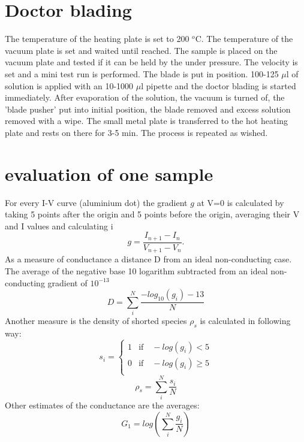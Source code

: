 \documentclass[a4paper]{article}
\begin{document}
\section{Doctor blading}
\label{sec:DB}
The temperature of the heating plate is set to 200 $^o$C.
The temperature of the vacuum plate is set and waited until reached.
The sample is placed on the vacuum plate and tested if it can be held by the under pressure.
The velocity is set and a mini test run is performed. 
The blade is put in position. 
100-125 $\mu$l of solution is applied with an 10-1000 $\mu$l pipette and the doctor blading is started immediately. 
After evaporation of the solution, the vacuum is turned of, the 'blade pusher' put into initial position, the blade removed and excess solution removed with a wipe. 
The small metal plate is transferred to the hot heating plate and rests on there for 3-5 min. 
The process is repeated as wished. 

\clearpage
\section{evaluation of one sample}
\label{sec:eval}
For every I-V curve (aluminium dot) the gradient $g$ at V=0 is calculated by taking 5 points after the origin and 5 points before the origin, averaging their V and I values and calculating i
\begin{equation}
	g = \frac{I_{n+1} - I_n}{V_{n+1} - V_n}.
\end{equation}
As a measure of conductance a distance D from an ideal non-conducting case. The average of the negative base 10 logarithm subtracted from an ideal non-conducting gradient of $10^{-13}$ 
\begin{equation}
	D = \sum_i^N \frac{ -log_{10}(g_i) - 13}{N}
	\label{eq:D}
\end{equation}
Another measure is the density of shorted species $\rho_{s}$ is calculated in following way:
\begin{equation}
	s_i = \begin{cases}
	1 &\text{if} \quad -log(g_i) < 5 \\
	0 &\text{if} \quad -log(g_i) \geq 5 \\
	\end{cases}
\end{equation}
\begin{equation}
	\rho_s = \sum_i^N \frac{s_i}{N}
	\label{eq:rho}
\end{equation}
Other estimates of the conductance are the averages:
\begin{equation}
	G_1 = log \left( \sum_i^N \frac{g_i}{N} \right)
\end{equation}
\end{document}
